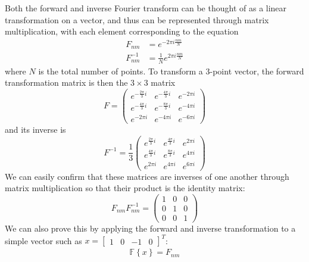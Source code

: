 \documentclass[11pt, letterpage]{article}
\begin{document}
Both the forward and inverse Fourier transform can be thought of as a linear
transformation on a vector, and thus can be represented through matrix
multiplication, with each element corresponding to the equation
\begin{equation}
  \begin{aligned}
    F_{nm} &= e^{- 2 \pi i \frac{nm}{N}} \\
    F_{nm}^{-1} &= \frac{1}{N} e^{2 \pi i \frac{nm}{N}}
  \end{aligned}
  \label{fft_mat_el}
\end{equation}
where $N$ is the total number of points. To transform a $3$-point vector, the
forward transformation matrix is then the $3 \times 3$ matrix
\begin{equation}
  F =
  \begin{pmatrix}
    e^{- \frac{2 \pi}{3} i} & e^{- \frac{4 \pi}{3} i} & e^{- 2 \pi i} \\
    e^{- \frac{4 \pi}{3} i} & e^{- \frac{8 \pi}{3} i} & e^{- 4 \pi i} \\
    e^{- 2 \pi i} & e^{- 4 \pi i} & e^{- 6 \pi i}
  \end{pmatrix}
\end{equation}
and its inverse is
\begin{equation}
  F^{-1} = \frac{1}{3}
  \begin{pmatrix}
    e^{\frac{2 \pi}{3} i} & e^{\frac{4 \pi}{3} i} & e^{2 \pi i} \\
    e^{\frac{4 \pi}{3} i} & e^{\frac{8 \pi}{3} i} & e^{4 \pi i} \\
    e^{2 \pi i} & e^{4 \pi i} & e^{6 \pi i}
  \end{pmatrix}
\end{equation}
We can easily confirm that these matrices are inverses of one another through
matrix multiplication so that their product is the identity matrix:
\begin{equation}
  F_{nm}F_{nm}^{-1}
  = \begin{pmatrix}
    1 & 0 & 0 \\
    0 & 1 & 0 \\
    0 & 0 & 1
  \end{pmatrix}
\end{equation}
We can also prove this by applying the forward and inverse transformation to a
simple vector such as $x = \begin{bmatrix} 1 & 0 & -1 & 0 \end{bmatrix}^T$:
\begin{equation}
  \begin{aligned}
    \mathbb{F} \left\{ x \right\}
    = F_{nm}
  \end{aligned}
\end{equation}
\end{document}
